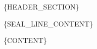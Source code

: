 \documentclass{article}
\begin{document}
\{HEADER_SECTION\}

\{SEAL_LINE_CONTENT\}

\vspace{1cm}

\{CONTENT\}

\newpage

\end{document}
